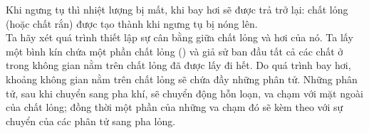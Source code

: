 Khi ngưng tụ thì nhiệt lượng bị mất, khi bay hơi sẽ được trả trở lại: chất lỏng (hoặc chất rắn) được tạo thành khi ngưng tụ bị nóng lên.\\

Ta hãy xét quá trình thiết lập sự cân bằng giữa chất lỏng và hơi của nó. Ta lấy một bình kín chứa một phần chất lỏng () và giả sử ban đầu tất cả các chất ở trong không gian nằm trên chất lỏng đã được lấy đi hết. Do quá trình bay hơi, khoảng không gian nằm trên chất lỏng sẽ chứa đầy những phân tử. Những phân tử, sau khi chuyển sang pha khí, sẽ chuyển động hỗn loạn, va chạm với mặt ngoài của chất lỏng; đồng thời một phần của những va chạm đó sẽ kèm theo với sự chuyển của các phân tử sang pha lỏng. 
